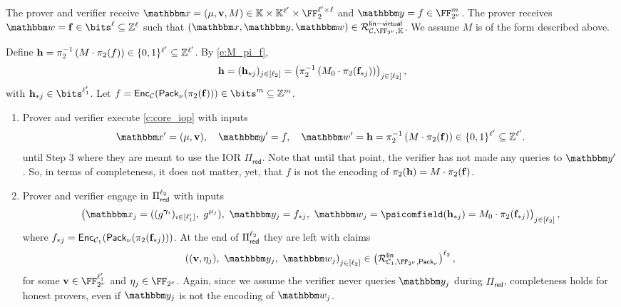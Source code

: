 \documentclass[11pt,letterpaper,usenames,dvipsnames]{article}
\begin{document}
\begin{construction}\label{c:virtual_iop}
The prover and verifier receive $\inp=(\mu, \vv,M)\in \evalfield \times \evalfield^{\codedim'} \times \FF_2^{\codedim'\times\codedim}$ and  $\oracle= f \in \comfield^\codelength$. The prover receives $\wit= \bff\in \bits^\codedim \subseteq \ZZ^\codedim$ such that $(\inp,\oracle, \wit) \in \Relation_{\cC, \comfield, \evalfield}^{\mathsf{lin-virtual}}$.  We assume $M$ is of the form described above.

 Define  $\mathbf{h} = \pi_2^{-1}\left(M\cdot \pi_2(f)\right) \in \{0,1\}^{\ell'} \subseteq \mathbb{Z}^{\ell'}$. By \eqref{e:M_pi_f}, $$\mathbf{h}=(\mathbf{h}_{*j})_{j\in [\ell_2]} = \left(\pi_2^{-1}\left( M_0\cdot \pi_2(\mathbf{f}_{*j}) \right)\right)_{j\in [\ell_2]},$$ with $ \bfh_{*j}\in \bits^{\codedim_1'}$. Let $f= \Enc_{\cC}(\pack(\pi_2(\bff))) \in \bits^{\codelength} \subseteq \ZZ^{\codelength}$.
 \begin{enumerate}[leftmargin=*]
     \item Prover and verifier execute \cref{c:core_iop}  with inputs 
$$
\inp' = (\mu, \vv),  \quad \oracle'=f,\quad  \wit' = \bfh=\pi_2^{-1}\left(M\cdot \pi_2(\bff)\right) \in \{0,1\}^{\codedim'} \subseteq \ZZ^{\codedim'}.
$$
 until Step 3 where they are meant to use the IOR $\Pi_{\mathsf{red}}$. Note that until that point, the verifier has not made any queries to $\oracle'$. So, in terms of completeness, it does not matter, yet, that $f$ is not the encoding of $\pi_2(\mathbf{h})=M\cdot \pi_2(\mathbf{f})$.
 \item  Prover and verifier engage in $\Pi_{\mathsf{red}}^{\ell_2}$ with inputs
 $$\left(\inp_j=((g^{\bm{\gamma}_i})_{i \in [\codedim_1']},\ g^{\mu_j}),\  \oracle_j= f_{*j}, \ \wit_j=\psicomfield(\bfh_{*j})=M_0\cdot \pi_2(\bff_{*j})\right)_{j\in [\codedim_2]},$$
 where $f_{*j}=\mathsf{Enc}_{\mathcal{C}_1}(\mathsf{Pack}_\nu(\pi_2(\mathbf{f}_{*j})))$. At the end of $\Pi_{\mathsf{red}}^{\ell_2}$ they are left with claims
%
\begin{equation}\label{e:virtual_IOPP_intermediate}
\left((\vv, \eta_j), \ \oracle_j, \ \wit_j\right)_{j\in [\codedim_2]} \in \left(\Relation^{\mathsf{lin}}_{\cC_1, \comfield,\pack}\right)^{\codedim_2},
\end{equation}
%
for some $\vv\in \comfield^{ \codedim_1'}$ and $\eta_j \in \comfield$. Again, since we assume the verifier never queries $\oracle_j$ during $\Pi_{\mathsf{red}}$, completeness holds for honest provers, even if $\oracle_j$ is not the encoding of $\wit_j$.


\end{enumerate}
\end{construction}
\end{document}
